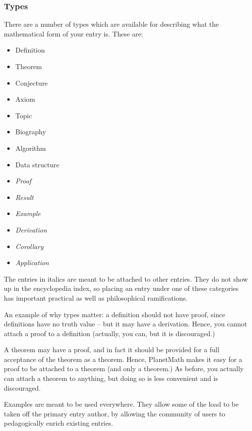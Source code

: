 \subsubsection{Types}
There are a number of types which are available for describing what
the mathematical form of your entry is. These are:
\begin{itemize}
\item Definition
\item Theorem
\item Conjecture
\item Axiom
\item Topic
\item Biography
\item Algorithm
\item Data structure
\item \textit{Proof}
\item \textit{Result}
\item \textit{Example}
\item \textit{Derivation}
\item \textit{Corollary}
\item \textit{Application}
\end{itemize}
The entries in italics are meant to be attached to other entries. They
do not show up in the encyclopedia index, so placing an entry under
one of these categories has important practical as well as
philosophical ramifications.

An example of why types matter: a definition should not have proof,
since definitions have no truth value -- but it may have a
derivation. Hence, you cannot attach a proof to a definition
(actually, you can, but it is discouraged.)

A theorem may have a proof, and in fact it should be provided for a
full acceptance of the theorem as a theorem. Hence, PlanetMath makes
it easy for a proof to be attached to a theorem (and only a theorem.)
As before, you actually can attach a theorem to anything, but doing so
is less convenient and is discouraged.

Examples are meant to be used everywhere. They allow some of the load
to be taken off the primary entry author, by allowing the community of
users to pedagogically enrich existing entries.

